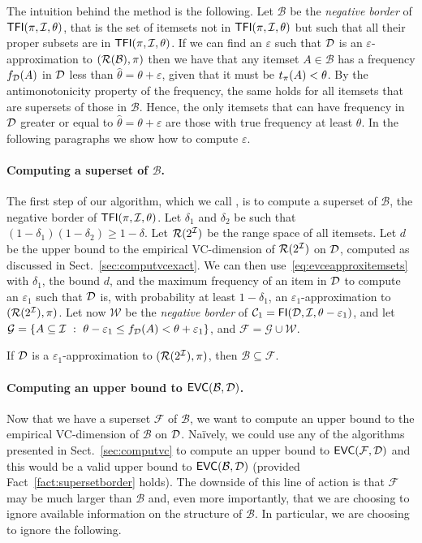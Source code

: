 The intuition behind the method is the following. Let $\mathcal{B}$ be the
\emph{negative border} of $\mathsf{TFI}(\pi,{\cal I},\theta)$, that is the set of itemsets
not in $\mathsf{TFI}(\pi,{\cal I},\theta)$ but such that all their proper subsets are in
$\mathsf{TFI}(\pi,{\cal I},\theta)$. If we can find an $\varepsilon$ such that ${\cal D}$ is an
$\varepsilon$-approximation to $(\mathcal{R}(\mathcal{B}),\pi)$ then we have that any
itemset $A\in\mathcal{B}$ has a frequency $f_{\cal D}(A)$ in ${\cal D}$ less than
$\hat{\theta}=\theta+\varepsilon$, given that it must be $t_\pi(A)<\theta$. By
the antimonotonicity property of the frequency, the same holds for all itemsets
that are supersets of those in $\mathcal{B}$. Hence, the only itemsets that can
have frequency in ${\cal D}$ greater or equal to $\hat{\theta}=\theta+\varepsilon$
are those with true frequency at least $\theta$. In the following paragraphs we
show how to compute $\varepsilon$.

\paragraph{Computing a superset of $\mathcal{B}$.} The first step of our
algorithm, which we call \ALG{}, is to compute a superset of $\mathcal{B}$, the
negative border of $\mathsf{TFI}(\pi,{\cal I},\theta)$. Let $\delta_1$ and $\delta_2$ be
such that $(1-\delta_1)(1-\delta_2)\ge 1-\delta$. Let $\mathcal{R}(2^{\cal I})$ be the
range space of all itemsets. Let $d$ be the upper bound to the empirical
VC-dimension of $\mathcal{R}(2^{\cal I})$ on ${\cal D}$, computed as discussed in
Sect.~\ref{sec:computvcexact}. We can then use~\eqref{eq:evceapproxitemsets}
with $\delta_1$, the bound $d$, and the maximum frequency of an item in ${\cal D}$ to
compute an $\varepsilon_1$ such that ${\cal D}$ is, with probability at least
$1-\delta_1$, an $\varepsilon_1$-approximation to $(\mathcal{R}(2^{\cal I}),\pi)$. Let
now $\mathcal{W}$ be the \emph{negative border} of
$\mathcal{C}_1=\mathsf{FI}({\cal D},{\cal I},\theta-\varepsilon_1)$, and let
$\mathcal{G}=\{A\subseteq{\cal I} ~:~ \theta-\varepsilon_1\le
f_{\cal D}(A)<\theta+\varepsilon_1\}$, and $\mathcal{F}=\mathcal{G}\cup\mathcal{W}$.

\begin{fact}\label{fact:supersetborder}
	If ${\cal D}$ is a $\varepsilon_1$-approximation to $(\mathcal{R}(2^{\cal I}),\pi)$,
	then $\mathcal{B}\subseteq\mathcal{F}$.
\end{fact}

\paragraph{Computing an upper bound to $\mathsf{EVC}(\mathcal{B},{\cal D})$.} Now that we
have a superset $\mathcal{F}$ of $\mathcal{B}$, we want to compute an upper
bound to the empirical VC-dimension of $\mathcal{B}$ on ${\cal D}$. Na\"ively, we
could use any of the algorithms presented in Sect.~\ref{sec:computvc} to compute
an upper bound to $\mathsf{EVC}(\mathcal{F},{\cal D})$ and this would be a valid upper bound
to $\mathsf{EVC}(\mathcal{B},{\cal D})$ (provided Fact~\ref{fact:supersetborder} holds). The
downside of this line of action is that $\mathcal{F}$ may be much larger than
$\mathcal{B}$ and, even more importantly, that we are choosing to ignore
available information on the structure of $\mathcal{B}$. In particular, we are
choosing to ignore the following.

